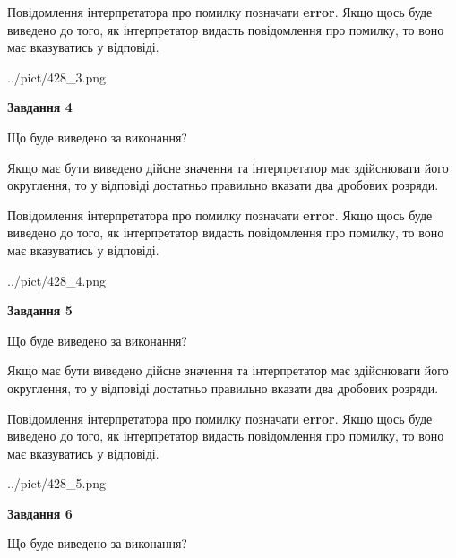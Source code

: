 \documentclass[12pt, ukrainian]{article}
\begin{document}
{\begin {Large}
Повідомлення інтерпретатора про помилку позначати \textbf{error}.
Якщо щось буде виведено до того, як інтерпретатор видасть повідомлення про помилку, 
то воно має вказуватись у відповіді. \par

\begin{center}
	{../pict/428_3.png}
\end{center}
\newpage

{\begin {center}\textbf{Завдання 4}\end {center}}\par
Що буде виведено за виконання? \par

Якщо має бути виведено дійсне значення та інтерпретатор має здійснювати його округлення, 
то у відповіді достатньо правильно вказати два дробових розряди.

Повідомлення інтерпретатора про помилку позначати \textbf{error}.
Якщо щось буде виведено до того, як інтерпретатор видасть повідомлення про помилку, 
то воно має вказуватись у відповіді. \par

\begin{center}
	{../pict/428_4.png}
\end{center}
\newpage

{\begin {center}\textbf{Завдання 5}\end {center}}\par
Що буде виведено за виконання? \par

Якщо має бути виведено дійсне значення та інтерпретатор має здійснювати його округлення, 
то у відповіді достатньо правильно вказати два дробових розряди.

Повідомлення інтерпретатора про помилку позначати \textbf{error}.
Якщо щось буде виведено до того, як інтерпретатор видасть повідомлення про помилку, 
то воно має вказуватись у відповіді. \par

\begin{center}
	{../pict/428_5.png}
\end{center}
\newpage

{\begin {center}\textbf{Завдання 6}\end {center}}\par
Що буде виведено за виконання? \par


\end{Large}}
\end{document}
